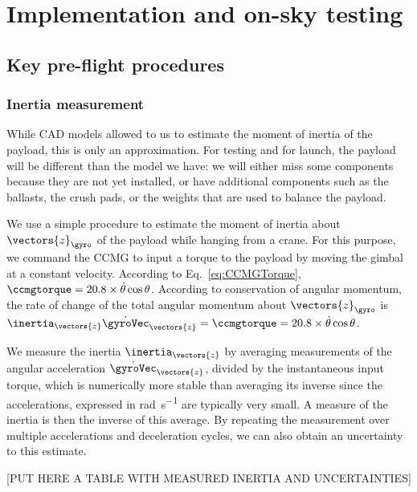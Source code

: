
\chapter[Implementation and on-sky testing]{Implementation and on-sky testing} %



\section{Key pre-flight procedures}
\subsection{Inertia measurement}
While CAD models allowed to us to estimate the moment of inertia of the payload, this is only an approximation. For testing and for launch, the payload will be different than the model we have: we will either miss some components because they are not yet installed, or have additional components such as the ballasts, the crush pads, or the weights that are used to balance the payload.

We use a simple procedure to estimate the moment of inertia about $\vectors{z}_\gyro$ of the payload while hanging from a crane. For this purpose, we command the CCMG to input a torque to the payload by moving the gimbal at a constant velocity. According to Eq.~\ref{eq:CCMGTorque}, $\ccmgtorque =  20.8\times \dot{\theta}\cos\theta$. According to conservation of angular momentum, the rate of change of the total angular momentum about $\vectors{z}_\gyro$ is $\inertia_\vectors{z}\dot{\gyroVec}_\vectors{z} = \ccmgtorque = 20.8\times \dot{\theta}\cos\theta$.

We measure the inertia $\inertia_\vectors{z}$ by averaging measurements of the angular acceleration $\dot{\gyroVec}_\vectors{z}$, divided by the instantaneous input torque, which is numerically more stable than averaging its inverse since the accelerations, expressed in \si{\radian\per\second} are typically very small. A measure of the inertia is then the inverse of this average. By repeating the measurement over multiple accelerations and deceleration cycles, we can also obtain an uncertainty to this estimate.

[PUT HERE A TABLE WITH MEASURED INERTIA AND UNCERTAINTIES]


